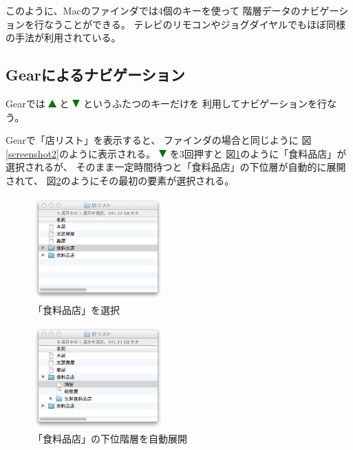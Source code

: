 \documentclass[twoside]{wiss}
\def\GEAR{\textsf{Gear}}
\def\figwidth{50mm}
\def\uptriangle{ \includegraphics[width=3mm,bb=0 0 36 36]{figures/uptriangle.pdf} }
\def\downtriangle{ \includegraphics[width=3mm,bb=0 0 36 36]{figures/downtriangle.pdf} }
\begin{document}
このように、Macのファインダでは4個のキーを使って
階層データのナビゲーションを行なうことができる。
テレビのリモコンやジョグダイヤルでもほぼ同様の手法が利用されている。

\subsection{{\GEAR}によるナビゲーション}

{\GEAR}では{\uptriangle}と{\downtriangle}というふたつのキーだけを
利用してナビゲーションを行なう。

{\GEAR}で「店リスト」を表示すると、
ファインダの場合と同じように
図\ref{screenshot2}のように表示される。
{\downtriangle}を3回押すと
図\ref{screenshot42}のように「食料品店」が選択されるが、
そのまま一定時間待つと「食料品店」の下位層が自動的に展開されて、
図\ref{screenshot7}のようにその最初の要素が選択される。

\begin{figure}[H]
\centerline{\includegraphics[width=\figwidth,bb=0 0 344 272]{figures/c074cd6daec3da0341125d1492b8a09c.png}}
\caption{「食料品店」を選択}
\label{screenshot42}
\end{figure}

\begin{figure}[H]
\centerline{\includegraphics[width=\figwidth,bb=0 0 344 272]{figures/2387e402f81dbe7917e04df82b0a659c.png}}
\caption{「食料品店」の下位階層を自動展開}
\label{screenshot7}
\end{figure}
\end{document}
